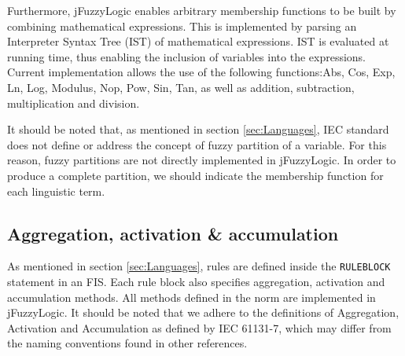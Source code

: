 \documentclass[11pt,twoside]{article}
\begin{document}
\begin{multicols}{2}
Furthermore, jFuzzyLogic enables arbitrary membership functions to be built by combining mathematical expressions. This is implemented by parsing an Interpreter Syntax Tree (IST) of mathematical expressions. IST is evaluated at running time, thus enabling the inclusion of variables into the expressions. Current implementation allows the use of the following functions:Abs, Cos, Exp, Ln, Log, Modulus, Nop, Pow, Sin, Tan, as well as addition, subtraction, multiplication and division.

It should be noted that, as mentioned in section \ref{sec:Languages}, IEC standard does not define or address the concept of fuzzy partition of a variable.
For this reason, fuzzy partitions are not directly implemented in jFuzzyLogic.
In order to produce a complete partition, we should indicate the membership function for each linguistic term.


\subsection{Aggregation, activation \& accumulation\label{sec:aggActAcc}}

As mentioned in section \ref{sec:Languages}, rules are defined inside the \texttt{RULEBLOCK} statement in an FIS. Each rule  block also specifies aggregation, activation and accumulation methods. All methods defined in the norm are implemented in jFuzzyLogic. It should be noted that we adhere to the definitions of Aggregation, Activation and Accumulation as defined by IEC 61131-7, which may differ from the naming conventions found in other references.


\end{multicols}
\end{document}
